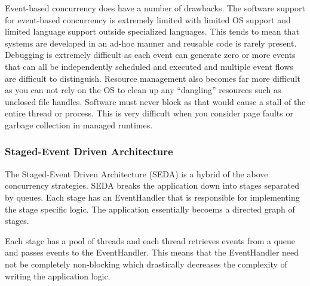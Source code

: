 \documentclass[a4paper]{article}
\begin{document}
Event-based concurrency does have a number of drawbacks. The software support for event-based concurrency is extremely limited with limited OS support and limited language support outside specialized languages. This tends to mean that systems are developed in an ad-hoc manner and reusable code is rarely present. Debugging is extremely difficult as each event can generate zero or more events that can all be independently scheduled and executed and multiple event flows are difficult to distinguish. Resource management also becomes far more difficult as you can not rely on the OS to clean up any ``dangling'' resources such as unclosed file handles. Software must never block as that would cause a stall of the entire thread or process. This is very difficult when you consider page faults or garbage collection in managed runtimes.

\subsubsection{Staged-Event Driven Architecture}

The Staged-Event Driven Architecture (SEDA) is a hybrid of the above concurrency strategies. SEDA breaks the application down into stages separated by queues. Each stage has an EventHandler that is responsible for implementing the stage specific logic. The application essentially becoems a directed graph of stages.

Each stage has a pool of threads and each thread retrieves events from a queue and passes events to the EventHandler. This means that the EventHandler need not be completely non-blocking which drastically decreases the complexity of writing the application logic.







\end{document}

